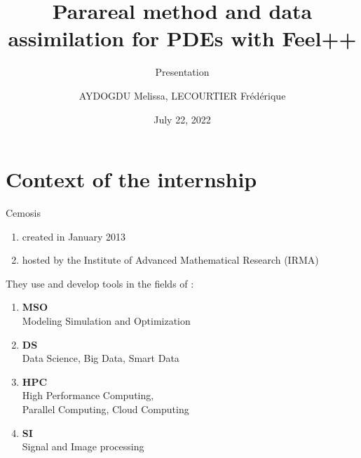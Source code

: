 \documentclass[10pt,xcolor={table,dvipsnames},t]{beamer}
\title[Lorenz]{Parareal method and data assimilation for PDEs with Feel++}
\subtitle{Presentation}
\author[name]{AYDOGDU Melissa, LECOURTIER Frédérique}
\institute{\large Strasbourg University}
\date{July 22, 2022}
\begin{document}
	
	\begin{frame}
		\titlepage
	\end{frame}
	
	\AtBeginSection[]{
		\begin{frame}
			\vfill
			\centering
			\begin{beamercolorbox}[sep=5pt,shadow=true,rounded=true]{subtitle}
				\usebeamerfont{title}\insertsectionhead\par%
			\end{beamercolorbox}
			\vfill
		\end{frame}
	}


	\section{Context of the internship}

	\begin{frame}{Cemosis}
		
		\begin{minipage}{0.4\hsize}
			\centering
			\begin{enumerate}[$\rightarrow$]
				\item created in January 2013
				\item hosted by the Institute of Advanced Mathematical Research (IRMA)
			\end{enumerate}
		\end{minipage} \quad
		\begin{minipage}{0.5\hsize}
			They use and develop tools in the fields of : 
			\begin{enumerate}[\textbullet]
				\item \textbf{MSO} \\
				Modeling Simulation and Optimization
				\item \textbf{DS} \\
				Data Science, Big Data, Smart Data
				\item \textbf{HPC} \\
				High Performance Computing, \\
				Parallel Computing, Cloud Computing
				\item \textbf{SI} \\
				Signal and Image processing
			\end{enumerate}
		\end{minipage}
	
	\end{frame}
\end{document}
